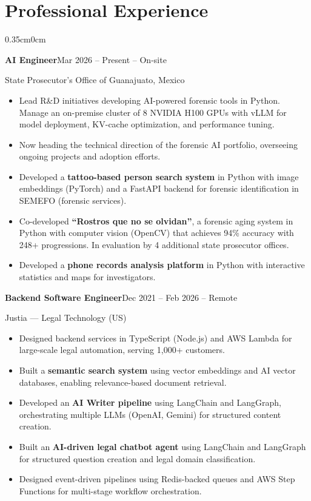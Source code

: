 \documentclass[a4paper, 10pt]{article}
\newenvironment{highlights}{
  \begin{itemize}[topsep=0.06cm,itemsep=0.05cm,parsep=0pt,leftmargin=0.6cm,label={\small\textbullet}]
    }{
  \end{itemize}
}
\newcommand{\entryheader}[2]{
  \par\noindent\textbf{#1}\hfill#2\par
}
\begin{document}
\section{Professional Experience}
\begin{adjustwidth}{0.35cm}{0cm}
\entryheader{AI Engineer}{Mar 2026 -- Present -- On-site}
State Prosecutor's Office of Guanajuato, Mexico

\begin{highlights}
\item Lead R\&D initiatives developing AI-powered forensic tools in Python. Manage an on-premise cluster of 8 NVIDIA H100 GPUs with vLLM for model deployment, KV-cache optimization, and performance tuning.
\item Now heading the technical direction of the forensic AI portfolio, overseeing ongoing projects and adoption efforts.
\item Developed a \textbf{tattoo-based person search system} in Python with image embeddings (PyTorch) and a FastAPI backend for forensic identification in SEMEFO (forensic services).
\item Co-developed \textbf{``Rostros que no se olvidan''}, a forensic aging system in Python with computer vision (OpenCV) that achieves 94\% accuracy with 248+ progressions. In evaluation by 4 additional state prosecutor offices.
\item Developed a \textbf{phone records analysis platform} in Python with interactive statistics and maps for investigators.
\end{highlights}

\vspace{0.12cm}

\entryheader{Backend Software Engineer}{Dec 2021 -- Feb 2026 -- Remote}
Justia --- Legal Technology (US)

\begin{highlights}
\item Designed backend services in TypeScript (Node.js) and AWS Lambda for large-scale legal automation, serving 1,000+ customers.
\item Built a \textbf{semantic search system} using vector embeddings and AI vector databases, enabling relevance-based document retrieval.
\item Developed an \textbf{AI Writer pipeline} using LangChain and LangGraph, orchestrating multiple LLMs (OpenAI, Gemini) for structured content creation.
\item Built an \textbf{AI-driven legal chatbot agent} using LangChain and LangGraph for structured question creation and legal domain classification.
\item Designed event-driven pipelines using Redis-backed queues and AWS Step Functions for multi-stage workflow orchestration.
\end{highlights}
\end{adjustwidth}
\end{document}
